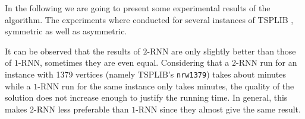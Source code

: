 In the following we are going to present some experimental results of the algorithm. The experiments where conducted for several instances of TSPLIB \cite{REINELT1995}, symmetric as well as asymmetric.






It can be observed that the results of $2$-RNN are only slightly better than those of $1$-RNN, sometimes they are even equal.
Considering that a $2$-RNN run for an instance with 1379 vertices (namely TSPLIB's \texttt{nrw1379}) takes about  minutes while a $1$-RNN run for the same instance only takes  minutes, the quality of the solution does not increase enough to justify the running time.
In general, this makes $2$-RNN less preferable than $1$-RNN since they almost give the same result.